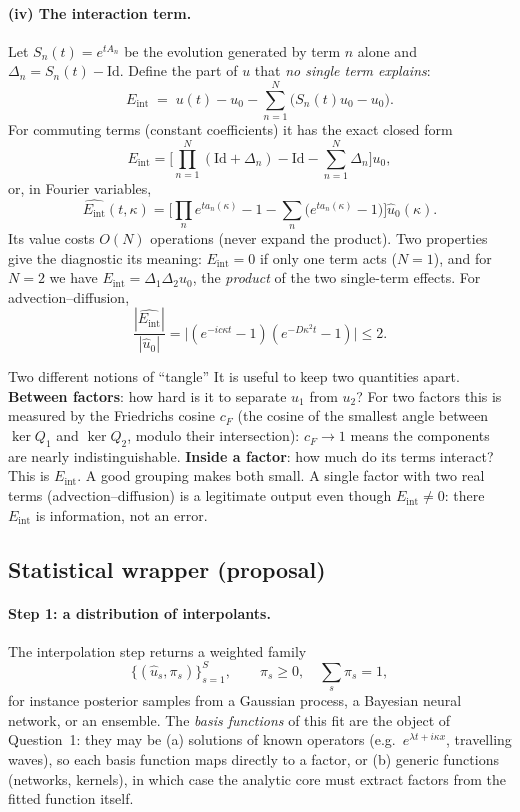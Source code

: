 \documentclass[11pt,a4paper]{article}
\newcommand{\Eint}{E_{\mathrm{int}}}
\begin{document}
\paragraph{(iv) The interaction term.}
Let $S_n(t)=e^{tA_n}$ be the evolution generated by term $n$ alone and $\Delta_n=S_n(t)-\mathrm{Id}$. Define the part of $u$ that \emph{no single term explains}:
\[
\Eint\;=\;u(t)-u_0-\sum_{n=1}^N\big(S_n(t)u_0-u_0\big).
\]
For commuting terms (constant coefficients) it has the exact closed form
\[
\Eint=\Big[\prod_{n=1}^N(\mathrm{Id}+\Delta_n)-\mathrm{Id}-\sum_{n=1}^N\Delta_n\Big]u_0,
\]
or, in Fourier variables,
\[
\widehat{\Eint}(t,\kappa)=\Big[\prod_n e^{ta_n(\kappa)}-1-\sum_n\big(e^{ta_n(\kappa)}-1\big)\Big]\hat u_0(\kappa).
\]
Its value costs $O(N)$ operations (never expand the product). Two properties give the diagnostic its meaning: $\Eint=0$ if only one term acts ($N=1$), and for $N=2$ we have $\Eint=\Delta_1\Delta_2u_0$, the \emph{product} of the two single-term effects. For advection--diffusion,
\[
\frac{|\widehat{\Eint}|}{|\hat u_0|}=\big|(e^{-ic\kappa t}-1)(e^{-D\kappa^2 t}-1)\big|\le 2 .
\]

\begin{notebox}{Two different notions of ``tangle''}
It is useful to keep two quantities apart. \textbf{Between factors}: how hard is it to separate $u_1$ from $u_2$? For two factors this is measured by the Friedrichs cosine $c_F$ (the cosine of the smallest angle between $\ker Q_1$ and $\ker Q_2$, modulo their intersection): $c_F\to1$ means the components are nearly indistinguishable. \textbf{Inside a factor}: how much do its terms interact? This is $\Eint$. A good grouping makes both small. A single factor with two real terms (advection--diffusion) is a legitimate output even though $\Eint\neq0$: there $\Eint$ is information, not an error.
\end{notebox}

\subsection{Statistical wrapper (proposal)}\label{sec:wrap}

\paragraph{Step 1: a distribution of interpolants.}
The interpolation step returns a weighted family
\[
\big\{(\hat u_s,\pi_s)\big\}_{s=1}^S,\qquad \pi_s\ge0,\quad \sum_s\pi_s=1,
\]
for instance posterior samples from a Gaussian process, a Bayesian neural network, or an ensemble. The \emph{basis functions} of this fit are the object of Question~1: they may be (a) solutions of known operators (e.g.\ $e^{\lambda t+i\kappa x}$, travelling waves), so each basis function maps directly to a factor, or (b) generic functions (networks, kernels), in which case the analytic core must extract factors from the fitted function itself.
\end{document}
